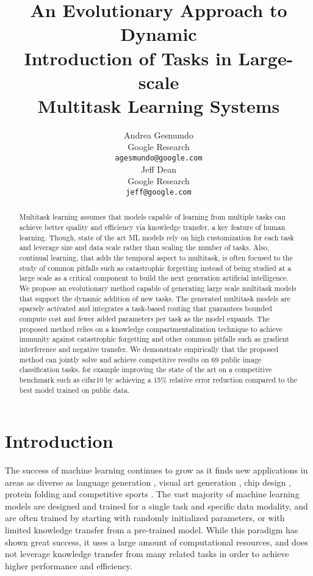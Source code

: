 \documentclass{article} \usepackage{iclr2023_conference,times}
\title{An Evolutionary Approach to Dynamic \\
Introduction of Tasks in Large-scale \\
Multitask Learning Systems}
\author{Andrea Gesmundo \\
  Google Research \\
  \texttt{agesmundo@google.com} \\
  \And
  Jeff Dean \\
  Google Research \\
  \texttt{jeff@google.com} \\
}
\begin{document}
\maketitle

\begin{abstract}



Multitask learning assumes that models capable of learning from multiple tasks can achieve better quality and efficiency via knowledge transfer, a key feature of human learning.
Though, state of the art ML models rely on high customization for each task and leverage size and data scale rather than scaling the number of tasks. Also, continual learning, that adds the temporal aspect to multitask, is often focused to the study of common pitfalls such as catastrophic forgetting instead of being studied at a large scale as a critical component to build the next generation artificial intelligence.
We propose an evolutionary method capable of generating large scale multitask models that support the dynamic addition of new tasks. The generated multitask models are sparsely activated and integrates a task-based routing that guarantees bounded compute cost and fewer added parameters per task as the model expands.
The proposed method relies on a knowledge compartmentalization technique to achieve immunity against catastrophic forgetting and other common pitfalls such as gradient interference and negative transfer.
We demonstrate empirically that the proposed method can jointly solve and achieve competitive results on 69 public image classification tasks,
for example
improving the state of the art on a competitive benchmark such as cifar10 by achieving a 15\% relative error reduction compared to the best model trained on public data.  


\end{abstract}


\section{Introduction}

The success of machine learning continues to grow as it finds new applications in areas as diverse as
language generation \citep{Brown2020LanguageMA},
visual art generation \citep{Ramesh2021ZeroShotTG},
chip design \citep{Mirhoseini2020ChipPW},
protein folding \citep{Senior2020ImprovedPS}
and competitive sports \citep{Silver2016MasteringTG, Vinyals2019GrandmasterLI}.
The vast majority of machine learning models are designed and trained for a single task and specific data modality, and are often trained by starting with randomly initialized parameters, or with limited knowledge transfer from a pre-trained model.
While this paradigm has shown great success, it uses a large amount of computational resources, and does not leverage knowledge transfer
from many related tasks 
in order to achieve higher performance and efficiency.
\end{document}
